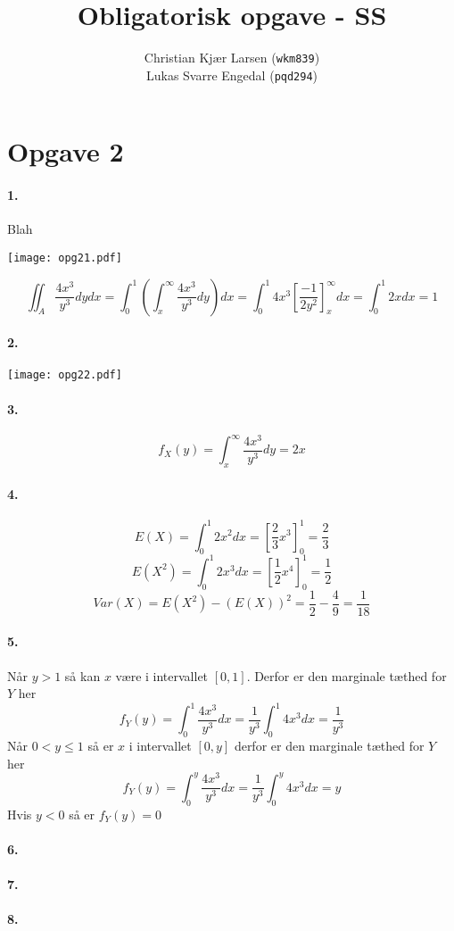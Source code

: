 \documentclass[12pt]{article}
\title{Obligatorisk opgave - SS}
\author{Christian Kjær Larsen (\texttt{wkm839})\\ Lukas Svarre Engedal (\texttt{pqd294})}
\begin{document}
\maketitle

\section*{Opgave 2}

\paragraph{1.}
Blah
\begin{center}
  \texttt{[image: opg21.pdf]}
\end{center}
\[
    \iint_A \frac{4x^3}{y^3} dydx = \int_0^1 \left( \int_x^\infty \frac{4x^3}{y^3} dy \right) dx
    = \int_0^1 4x^3 \left[ \frac{-1}{2y^2} \right]_x^\infty dx
    = \int_0^1 2x dx = 1
\]

\paragraph{2.}
\begin{center}
  \texttt{[image: opg22.pdf]}
\end{center}
\paragraph{3.}
\[
    f_X(y)=\int_x^\infty \frac{4x^3}{y^3} dy = 2x
\]
\paragraph{4.}
\[
    E(X) = \int_0^1 2x^2 dx = \left[ \frac{2}{3}x^3 \right]_0^1 = \frac{2}{3}
\]
\[
    E(X^2) = \int_0^1 2x^3 dx = \left[ \frac{1}{2}x^4 \right]_0^1 = \frac{1}{2}
\]
\[
    Var(X) = E(X^2) - (E(X))^2 = \frac{1}{2} - \frac{4}{9} = \frac{1}{18}
\]
\paragraph{5.}
Når $y > 1$ så kan $x$ være i intervallet $[0,1]$. Derfor er den marginale tæthed for $Y$ her
\[
    f_Y(y) = \int_0^1 \frac{4x^3}{y^3} dx = \frac{1}{y^3} \int_0^1 4x^3 dx = \frac{1}{y^3}
\]
Når $0 < y \leq 1$ så er $x$ i intervallet $[0, y]$ derfor er den marginale tæthed for $Y$ her
\[
    f_Y(y) = \int_0^y \frac{4x^3}{y^3} dx = \frac{1}{y^3} \int_0^y 4x^3 dx = y
\]
Hvis $y < 0$ så er $f_Y(y) = 0$
\paragraph{6.}
\paragraph{7.}
\paragraph{8.}
\end{document}

